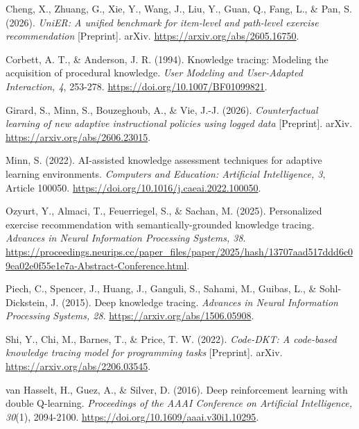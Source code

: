 \documentclass[preprint,11pt,authoryear]{elsarticle}
\begin{document}
\begin{list}{}{\setlength{\leftmargin}{1.3em}\setlength{\itemindent}{-1.3em}}

\item Cheng, X., Zhuang, G., Xie, Y., Wang, J., Liu, Y., Guan, Q., Fang, L., \& Pan, S. (2026). \textit{UniER: A unified benchmark for item-level and path-level exercise recommendation} [Preprint]. arXiv. \url{https://arxiv.org/abs/2605.16750}.

\item Corbett, A. T., \& Anderson, J. R. (1994). Knowledge tracing: Modeling the acquisition of procedural knowledge. \textit{User Modeling and User-Adapted Interaction, 4}, 253-278. \url{https://doi.org/10.1007/BF01099821}.

\item Girard, S., Minn, S., Bouzeghoub, A., \& Vie, J.-J. (2026). \textit{Counterfactual learning of new adaptive instructional policies using logged data} [Preprint]. arXiv. \url{https://arxiv.org/abs/2606.23015}.

\item Minn, S. (2022). AI-assisted knowledge assessment techniques for adaptive learning environments. \textit{Computers and Education: Artificial Intelligence, 3}, Article 100050. \url{https://doi.org/10.1016/j.caeai.2022.100050}.

\item Ozyurt, Y., Almaci, T., Feuerriegel, S., \& Sachan, M. (2025). Personalized exercise recommendation with semantically-grounded knowledge tracing. \textit{Advances in Neural Information Processing Systems, 38}. \url{https://proceedings.neurips.cc/paper_files/paper/2025/hash/13707aad517ddd6c09ea02e0f55e1e7a-Abstract-Conference.html}.

\item Piech, C., Spencer, J., Huang, J., Ganguli, S., Sahami, M., Guibas, L., \& Sohl-Dickstein, J. (2015). Deep knowledge tracing. \textit{Advances in Neural Information Processing Systems, 28}. \url{https://arxiv.org/abs/1506.05908}.

\item Shi, Y., Chi, M., Barnes, T., \& Price, T. W. (2022). \textit{Code-DKT: A code-based knowledge tracing model for programming tasks} [Preprint]. arXiv. \url{https://arxiv.org/abs/2206.03545}.

\item van Hasselt, H., Guez, A., \& Silver, D. (2016). Deep reinforcement learning with double Q-learning. \textit{Proceedings of the AAAI Conference on Artificial Intelligence, 30}(1), 2094-2100. \url{https://doi.org/10.1609/aaai.v30i1.10295}.

\end{list}
\end{document}
